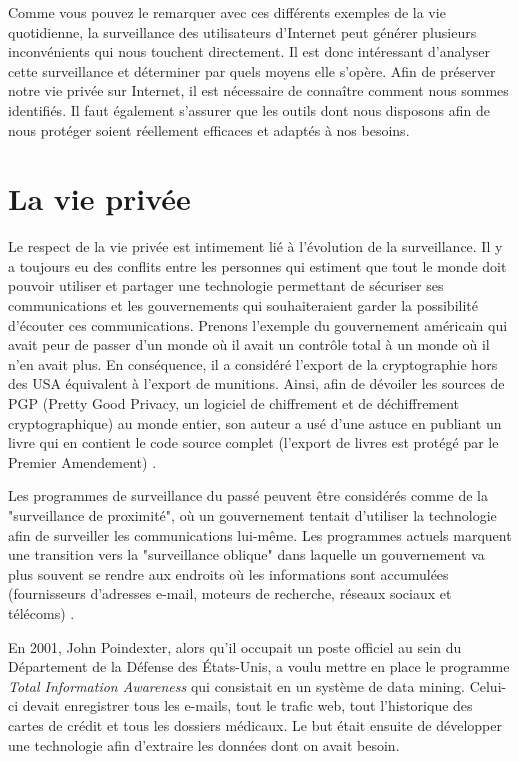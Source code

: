Comme vous pouvez le remarquer avec ces différents exemples de la vie quotidienne, la surveillance des utilisateurs d'Internet peut générer plusieurs inconvénients qui nous touchent directement. Il est donc intéressant d'analyser cette surveillance et déterminer par quels moyens elle s'opère. Afin de préserver notre vie privée sur Internet, il est nécessaire de connaître comment nous sommes identifiés. Il faut également s'assurer que les outils dont nous disposons afin de nous protéger soient réellement efficaces et adaptés à nos besoins.


\section{La vie privée}
Le respect de la vie privée est intimement lié à l'évolution de la surveillance.
Il y a toujours eu des conflits entre les personnes qui estiment que tout le monde doit pouvoir utiliser et partager une technologie permettant de sécuriser ses communications et les gouvernements qui souhaiteraient garder la possibilité d'écouter ces communications. Prenons l'exemple du gouvernement américain qui avait peur de passer d'un monde où il avait un contrôle total à un monde où il n'en avait plus. En conséquence, il a considéré l'export de la cryptographie hors des USA équivalent à l'export de munitions. Ainsi, afin de dévoiler les sources de PGP (Pretty Good Privacy, un logiciel de chiffrement et de déchiffrement cryptographique) au monde entier, son auteur a usé d'une astuce en publiant un livre qui en contient le code source complet (l'export de livres est protégé par le Premier Amendement) \cite{youtube_moxie_marlinspike}.
\newline

Les programmes de surveillance du passé peuvent être considérés comme de la "surveillance de proximité", où un gouvernement tentait d'utiliser la technologie afin de surveiller les communications lui-même. Les programmes actuels marquent une transition vers la "surveillance oblique" dans laquelle un gouvernement va plus souvent se rendre aux endroits où les informations sont accumulées (fournisseurs d'adresses e-mail, moteurs de recherche, réseaux sociaux et télécoms) \cite{wired_nothing_to_hide}.
\newline

En 2001, John Poindexter, alors qu'il occupait un poste officiel au sein du Département de la Défense des États-Unis, a voulu mettre en place le programme \textit{Total Information Awareness} qui consistait en un système de data mining. Celui-ci devait enregistrer tous les e-mails, tout le trafic web, tout l'historique des cartes de crédit et tous les dossiers médicaux. Le but était ensuite de développer une technologie afin d'extraire les données dont on avait besoin.

